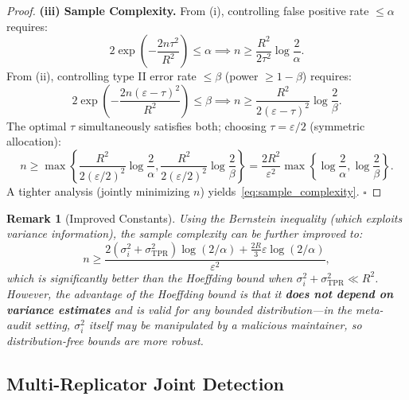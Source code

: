 \documentclass[11pt,a4paper]{article}
\newtheorem{remark}[theorem]{Remark}
\theoremstyle{definition}
\begin{document}
\begin{proof}
\textbf{(iii) Sample Complexity.}
From (i), controlling false positive rate $\leq \alpha$ requires:
\begin{equation*}
    2\exp\left(-\frac{2n\tau^2}{R^2}\right) \leq \alpha \implies n \geq \frac{R^2}{2\tau^2} \log\frac{2}{\alpha}.
\end{equation*}
From (ii), controlling type II error rate $\leq \beta$ (power $\geq 1-\beta$) requires:
\begin{equation*}
    2\exp\left(-\frac{2n(\varepsilon - \tau)^2}{R^2}\right) \leq \beta \implies n \geq \frac{R^2}{2(\varepsilon - \tau)^2} \log\frac{2}{\beta}.
\end{equation*}
The optimal $\tau$ simultaneously satisfies both; choosing $\tau = \varepsilon/2$ (symmetric allocation):
\begin{equation*}
    n \geq \max\left\{\frac{R^2}{2(\varepsilon/2)^2}\log\frac{2}{\alpha}, \frac{R^2}{2(\varepsilon/2)^2}\log\frac{2}{\beta}\right\} = \frac{2R^2}{\varepsilon^2} \max\left\{\log\frac{2}{\alpha}, \log\frac{2}{\beta}\right\}.
\end{equation*}
A tighter analysis (jointly minimizing $n$) yields~\eqref{eq:sample_complexity}. $\square$
\end{proof}

\begin{remark}[Improved Constants]
Using the Bernstein inequality (which exploits variance information), the sample complexity can be further improved to:
\begin{equation*}
    n \geq \frac{2(\sigma_i^2 + \sigma_{\text{TPR}}^2) \log(2/\alpha) + \frac{2R}{3}\varepsilon \log(2/\alpha)}{\varepsilon^2},
\end{equation*}
which is significantly better than the Hoeffding bound when $\sigma_i^2 + \sigma_{\text{TPR}}^2 \ll R^2$. However, the advantage of the Hoeffding bound is that it \textbf{does not depend on variance estimates} and is valid for any bounded distribution---in the meta-audit setting, $\sigma_i^2$ itself may be manipulated by a malicious maintainer, so distribution-free bounds are more robust.
\end{remark}

\subsection{Multi-Replicator Joint Detection}
\end{document}
